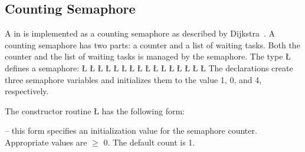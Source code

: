 \documentclass[openright,twoside]{report}
\begin{document}
\subsection{Counting Semaphore}
\label{s:CountingSemaphore}

A  in \uC is implemented as a counting semaphore as described by Dijkstra~\cite{Dijkstra65}.
A counting semaphore has two parts: a counter and a list of waiting tasks.
Both the counter and the list of waiting tasks is managed by the semaphore.
The type \LGinlinetrue\LGbegin\lgrinde\L{}\endlgrinde\LGend{} defines a semaphore:
\LGinlinefalse\LGbegin\lgrinde
\L{}
\L{}
\L{\LB{}}
\L{\LB{}}
\L{\LB{}}
\L{\LB{}}
\L{\LB{}}
\L{\LB{}}
\L{\LB{}}
\L{\LB{}}
\L{\LB{}}
\L{\LB{}}
\L{\LB{}}
\L{\LB{\};}}
\L{}
\L{}
\endlgrinde\LGend
{}%
%
%
%
%
The declarations create three semaphore variables and initializes them to the value 1, 0, and 4, respectively.

The constructor routine \LGinlinetrue\LGbegin\lgrinde\L{}\endlgrinde\LGend{} has the following form:
\begin{prefix}
\item[\LGinlinetrue\LGbegin\lgrinde\L{\LB{\V{uSemaphore}(\0\K{int}\0\V{count}\0)}}\endlgrinde\LGend{}]
-- this form specifies an initialization value for the semaphore counter.
Appropriate values are $\geq$ 0.
The default count is 1.
\end{prefix}
\end{document}
